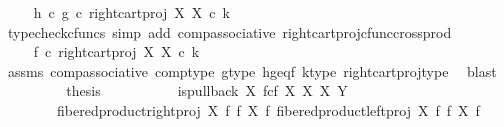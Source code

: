 \begin{isabellebody}
\ \isamarkupfalse%
\ {\isachardoublequoteopen}{\isachardot}{\kern0pt}{\isachardot}{\kern0pt}{\isachardot}{\kern0pt}\ {\isacharequal}{\kern0pt}\ h\ {\isasymcirc}\isactrlsub c\ g\ {\isasymcirc}\isactrlsub c\ right{\isacharunderscore}{\kern0pt}cart{\isacharunderscore}{\kern0pt}proj\ X\ X\ {\isasymcirc}\isactrlsub c\ k{\isachardoublequoteclose}\isanewline
\ \ \ \ \ \ \ \ \isamarkupfalse%
\ {\isacharparenleft}{\kern0pt}typecheck{\isacharunderscore}{\kern0pt}cfuncs{\isacharcomma}{\kern0pt}\ simp\ add{\isacharcolon}{\kern0pt}\ comp{\isacharunderscore}{\kern0pt}associative{}\ right{\isacharunderscore}{\kern0pt}cart{\isacharunderscore}{\kern0pt}proj{\isacharunderscore}{\kern0pt}cfunc{\isacharunderscore}{\kern0pt}cross{\isacharunderscore}{\kern0pt}prod{\isacharparenright}{\kern0pt}\isanewline
\ \ \ \ \ \ \isamarkupfalse%
\ \isamarkupfalse%
\ {\isachardoublequoteopen}{\isachardot}{\kern0pt}{\isachardot}{\kern0pt}{\isachardot}{\kern0pt}\ {\isacharequal}{\kern0pt}\ f\ {\isasymcirc}\isactrlsub c\ right{\isacharunderscore}{\kern0pt}cart{\isacharunderscore}{\kern0pt}proj\ X\ X\ {\isasymcirc}\isactrlsub c\ k{\isachardoublequoteclose}\isanewline
\ \ \ \ \ \ \ \ \isamarkupfalse%
\ assms{\isacharparenleft}{\kern0pt}{}{\isacharparenright}{\kern0pt}\ comp{\isacharunderscore}{\kern0pt}associative{}\ comp{\isacharunderscore}{\kern0pt}type\ g{\isacharunderscore}{\kern0pt}type\ h{\isacharunderscore}{\kern0pt}g{\isacharunderscore}{\kern0pt}eq{\isacharunderscore}{\kern0pt}f\ k{\isacharunderscore}{\kern0pt}type\ right{\isacharunderscore}{\kern0pt}cart{\isacharunderscore}{\kern0pt}proj{\isacharunderscore}{\kern0pt}type\ \isamarkupfalse%
\ blast\isanewline
\ \ \ \ \ \ \isamarkupfalse%
\ \isamarkupfalse%
\ {\isacharquery}{\kern0pt}thesis\isacommand{{\isachardot}{\kern0pt}}\isamarkupfalse%
\isanewline
\ \ \ \ \isamarkupfalse%
\isanewline
\isanewline
\ \ \ \ \isamarkupfalse%
\ {\isachardoublequoteopen}is{\isacharunderscore}{\kern0pt}pullback\ {\isacharparenleft}{\kern0pt}X\ \isactrlbsub f\isactrlesub {\isasymtimes}\isactrlsub c\isactrlbsub f\isactrlesub \ X{\isacharparenright}{\kern0pt}\ X\ X\ Y\isanewline
\ \ \ \ \ \ \ \ {\isacharparenleft}{\kern0pt}fibered{\isacharunderscore}{\kern0pt}product{\isacharunderscore}{\kern0pt}right{\isacharunderscore}{\kern0pt}proj\ X\ f\ f\ X{\isacharparenright}{\kern0pt}\ f\ {\isacharparenleft}{\kern0pt}fibered{\isacharunderscore}{\kern0pt}product{\isacharunderscore}{\kern0pt}left{\isacharunderscore}{\kern0pt}proj\ X\ f\ f\ X{\isacharparenright}{\kern0pt}\ f{\isachardoublequoteclose}\isanewline

\end{isabellebody}
